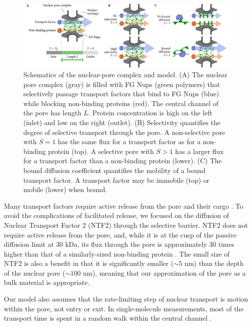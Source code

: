 \begin{figure}[t!]
\centering
\includegraphics[width=17.8cm]{figs/ch02/fig1.pdf}
\caption[Schematics of the nuclear-pore complex and model.]{Schematics of the nuclear-pore complex and model. (A) The
  nuclear pore complex (gray) is filled with FG Nups (green polymers)
  that selectively passage transport factors that bind to FG Nups
  (blue) while blocking non-binding proteins (red). The central
  channel of the pore has length $L$. Protein concentration is high on
  the left (inlet) and low on the right (outlet).  (B) Selectivity
  quantifies the degree of selective transport through the pore. A
  non-selective pore with $S=1$ has the same flux for a transport
  factor as for a non-binding protein (top). A selective pore with
  $S>1$ has a larger flux for a transport factor than a non-binding
  protein (lower). (C) The bound diffusion coefficient quantifies the
  mobility of a bound transport factor.  A transport factor may be
  immobile (top) or mobile (lower) when bound. }
\label{fig:cartoon}
\end{figure}

Many transport factors require active release from the pore and their cargo \cite{lowe15, mincer11, gorlich96, gilchrist02}.  To avoid the complications of facilitated release, we focused on the diffusion of Nuclear Transport Factor 2 (NTF2) through the selective barrier.  NTF2 does not require active release from the pore, and, while it is at the cusp of the passive  diffusion limit at 30 kDa, its flux through the pore is approximately 30 times higher than that of a similarly-sized non-binding protein \cite{mincer11, zilman07}.  The small size of NTF2 is also a benefit in that it is significantly smaller ($\sim 5$ nm) than the depth of the nuclear pore ($\sim 100$ nm), meaning that our approximation of the pore as a bulk material is appropriate.

Our model also assumes that the rate-limiting step of nuclear transport is motion within the pore, not entry or exit.  In single-molecule measurements, most of the transport time is spent in a random walk within the central channel \cite{yang04, tu13}.

